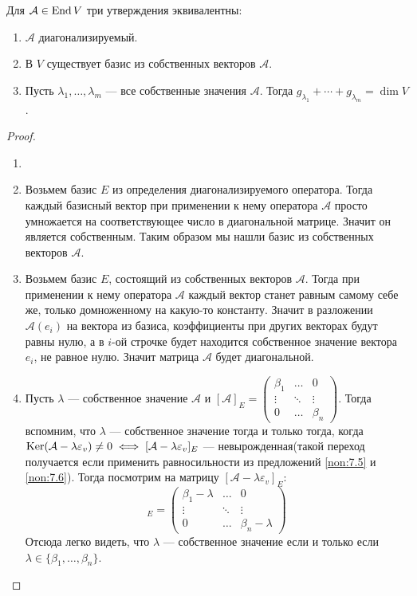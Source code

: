 \documentclass[../main.tex]{subfiles}
\begin{document}
\begin{theorem-non}
\label{non:7.10}
  Для $\mathcal{A} \in \operatorname{End} V$ три утверждения эквивалентны:
  \begin{enumerate}
    \item $\mathcal{A}$ диагонализируемый.
    \item В $V$ существует базис из собственных векторов $\mathcal{A}$.
    \item Пусть $\lambda_1, \dotsc, \lambda_m$ --- все собственные значения $\mathcal{A}$. Тогда $g_{\lambda_1} + \dotsb + g_{\lambda_m} = \dim V$.
  \end{enumerate}
\end{theorem-non}
\begin{proof}
  \begin{enumerate}
  \item[]
  \item[] 
  Возьмем базис $E$ из определения диагонализируемого оператора. Тогда каждый базисный вектор при применении к нему оператора $\mathcal{A}$ просто умножается на соответствующее число в диагональной матрице. Значит он является собственным. Таким образом мы нашли базис из собственных векторов $\mathcal{A}$.
  \item[] 
  Возьмем базис $E$, состоящий из собственных векторов $\mathcal{A}$. Тогда при применении к нему оператора $\mathcal{A}$ каждый вектор станет равным самому себе же, только домноженному на какую-то константу. Значит в разложении $\mathcal{A}(e_i)$ на вектора из базиса, коэффициенты при других векторах будут равны нулю, а в $i$-ой строчке будет находится собственное значение вектора $e_i$, не равное нулю. Значит матрица $\mathcal{A}$ будет диагональной.
  \item[] 
  Пусть $\lambda$ --- собственное значение $\mathcal{A}$ и
  $
    [\mathcal{A}]_E =
    \begin{pmatrix}
      \beta_1 & \hdots & 0 \\
      \vdots & \ddots & \vdots \\
      0 & \hdots & \beta_n
    \end{pmatrix}
  $. Тогда вспомним, что $\lambda$ --- собственное значение тогда и только тогда, когда $\operatorname{Ker}(\mathcal{A} - \lambda \varepsilon_v) \neq 0 \iff [\mathcal{A} - \lambda \varepsilon_v]_E$ --- невырожденная(такой переход получается если применить равносильности из предложений \ref{non:7.5} и \ref{non:7.6}). Тогда посмотрим на матрицу $[\mathcal{A} - \lambda \varepsilon_v]_E$:
  \begin{equation*}
    [\mathcal{A} - \lambda \varepsilon_v]_E
    =
    \begin{pmatrix}
      \beta_1 - \lambda & \hdots & 0 \\
      \vdots & \ddots & \vdots \\
      0 & \hdots & \beta_n - \lambda
    \end{pmatrix}
  \end{equation*}
  Отсюда легко видеть, что $\lambda$ --- собственное значение если и только если $\lambda \in \{\beta_1, \dotsc, \beta_n\}$.


\end{enumerate}
\end{proof}
\end{document}
